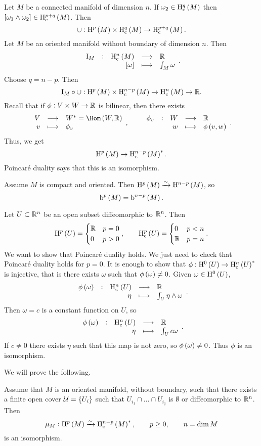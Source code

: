 
Let $ M $ be a connected manifold of dimension $ n $. If $ \omega_2 \in \H_\c^q\br{M} $ then $ \sbr{\omega_1 \wedge \omega_2} \in \H_\c^{p + q}\br{M} $. Then
$$ \cup : \H^p\br{M} \times \H_\c^q\br{M} \to \H_\c^{p + q}\br{M}. $$
Let $ M $ be an oriented manifold without boundary of dimension $ n $. Then
$$ \function[\I_M]{\H_\c^n\br{M}}{\RR}{\sbr{\omega}}{\int_M \omega}. $$
Choose $ q = n - p $. Then
$$ \I_M \circ \cup : \H^p\br{M} \times \H_\c^{n - p}\br{M} \to \H_\c^n\br{M} \to \RR. $$
Recall that if $ \phi : V \times W \to \mathbb{R} $ is bilinear, then there exists
$$ \function{V}{W^* = \Hom\br{W, \RR}}{v}{\phi_v}, \qquad \function[\phi_v]{W}{\RR}{w}{\phi\br{v, w}}. $$
Thus, we get
$$ \H^p\br{M} \to \H_\c^{n - p}\br{M}^*. $$
Poincar\'e duality says that this is an isomorphism.

\begin{example*}
Assume $ M $ is compact and oriented. Then $ \H^p\br{M} \xrightarrow{\sim} \H^{n - p}\br{M} $, so
$$ \b^p\br{M} = \b^{n - p}\br{M}. $$
\end{example*}

\begin{example}
Let $ U \subset \mathbb{R}^n $ be an open subset diffeomorphic to $ \mathbb{R}^n $. Then
$$ \H^p\br{U} =
\begin{cases}
\RR & p = 0 \\
0 & p > 0
\end{cases},
\qquad \H_\c^p\br{U} =
\begin{cases}
0 & p < n \\
\RR & p = n
\end{cases}.
$$
We want to show that Poincar\'e duality holds. We just need to check that Poincar\'e duality holds for $ p = 0 $. It is enough to show that $ \phi : \H^0\br{U} \to \H_\c^n\br{U}^* $ is injective, that is there exists $ \omega $ such that $ \phi\br{\omega} \ne 0 $. Given $ \omega \in \H^0\br{U} $,
$$ \function[\phi\br{\omega}]{\H_\c^n\br{U}}{\RR}{\eta}{\int_U \eta \wedge \omega}. $$
Then $ \omega = c $ is a constant function on $ U $, so
$$ \function[\phi\br{\omega}]{\H_\c^n\br{U}}{\RR}{\eta}{\int_U c\omega}. $$
If $ c \ne 0 $ there exists $ \eta $ such that this map is not zero, so $ \phi\br{\omega} \ne 0 $. Thus $ \phi $ is an isomorphism.
\end{example}

\pagebreak

We will prove the following.

\begin{theorem}
\label{thm:2.52}
Assume that $ M $ is an oriented manifold, without boundary, such that there exists a finite open cover $ \UUU = \cbr{U_i} $ such that $ U_{i_1} \cap \dots \cap U_{i_q} $ is $ \emptyset $ or diffeomorphic to $ \mathbb{R}^n $. Then
$$ \mu_M : \H^p\br{M} \xrightarrow{\sim} \H_\c^{n - p}\br{M}^*, \qquad p \ge 0, \qquad n = \dim M $$
is an isomorphism.
\end{theorem}

